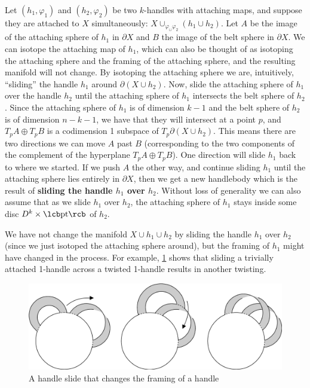 Let $(h_1,\varphi_1)$ and $(h_2,\varphi_2)$ be two $k$-handles with attaching maps, and suppose they are attached to $X$ simultaneously: $X \cup_{\varphi_ \cup \varphi_2} (h_1 \cup h_2)$. Let $A$ be the image of the attaching sphere of $h_1$ in $\partial X$ and $B$ the image of the belt sphere in $\partial X$. We can isotope the attaching map of $h_1$, which can also be thought of as isotoping the attaching sphere and the framing of the attaching sphere, and the resulting manifold will not change. By isotoping the attaching sphere we are, intuitively, ``sliding'' the handle $h_1$ around $\partial(X \cup h_2)$. Now, slide the attaching sphere of $h_1$ over the handle $h_2$ until the attaching sphere of $h_1$ intersects the belt sphere of $h_2$. Since the attaching sphere of $h_1$ is of dimension $k-1$ and the belt sphere of $h_2$ is of dimension $n-k-1$, we have that they will intersect at a point $p$, and $T_p A \oplus T_p B$ is a codimension 1 subspace of $T_p \partial(X \cup h_2)$. This means there are two directions we can move $A$ past $B$ (corresponding to the two components of the complement of the hyperplane $T_p A \oplus T_p B$). One direction will slide $h_1$ back to where we started. If we push $A$ the other way, and continue sliding $h_1$ until the attaching sphere lies entirely in $\partial X$, then we get a new handlebody which is the result of \textbf{sliding the handle $h_1$ over $h_2$}. Without loss of generality we can also assume that as we slide $h_1$ over $h_2$, the attaching sphere of $h_1$ stays inside some disc $D^k \times \lcb \text{pt} \rcb$ of $h_2$.

We have not change the manifold $X \cup h_1 \cup h_2$ by sliding the handle $h_1$ over $h_2$ (since we just isotoped the attaching sphere around), but the framing of $h_1$ might have changed in the process. For example, \cref{handle-slide} shows that sliding a trivially attached 1-handle across a twisted 1-handle results in another twisting. 

\begin{figure}[tb]
\centering
\includegraphics[scale=.6]{graphics/handle-slide}
\caption{A handle slide that changes the framing of a handle}
\label{handle-slide}
\end{figure}

